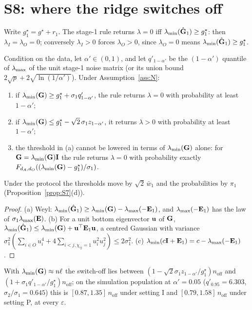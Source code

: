 \section{S8: where the ridge switches off}
\label{sec:S8}

Write $g_1^\star=g^\star+r_1$. The stage-1 rule returns $\lambda=0$ iff $\lambda_{\min}(\hat{\mathbf{G}}_1)\ge g^\star_1$: then $\lambda_I=\lambda_O=0$; conversely $\lambda_I>0$ forces $\lambda_O>0$, since $\lambda_O=0$ means $\lambda_{\min}(\hat{\mathbf{G}}_1)\ge g^\star_1$.

\begin{proposition}\label{prop:S8}
Condition on the data, let $\alpha'\in(0,1)$, and let $q'_{1-\alpha'}$ be the $(1-\alpha')$ quantile of $\lambda_{\max}$ of the unit stage-1 noise matrix (or its union bound $2\sqrt p+2\sqrt{\ln(1/\alpha')}$). Under Assumption~\ref{ass:N}:
\begin{enumerate}[nosep,label=(\alph*)]
  \item if $\lambda_{\min}(\mathbf{G})\ge g^\star_1+\sigma_1q'_{1-\alpha'}$, the rule returns $\lambda=0$ with probability at least $1-\alpha'$;
  \item if $\lambda_{\min}(\mathbf{G})\le g^\star_1-\sqrt2\,\sigma_1z_{1-\alpha'}$, it returns $\lambda>0$ with probability at least $1-\alpha'$;
  \item the threshold in (a) cannot be lowered in terms of $\lambda_{\min}(\mathbf{G})$ alone: for $\mathbf{G}=\lambda_{\min}(\mathbf{G})\mathbf{I}$ the rule returns $\lambda=0$ with probability exactly $F_{d_A,d_O}((\lambda_{\min}(\mathbf{G})-g^\star_1)/\sigma_1)$.
\end{enumerate}
Under the protocol the thresholds move by $\sqrt2\,\bar w_1$ and the probabilities by $\pi_1$ (Proposition~\ref{prop:S7}(d)).
\end{proposition}
\begin{proof}
(a) Weyl: $\lambda_{\min}(\hat{\mathbf{G}}_1)\ge\lambda_{\min}(\mathbf{G})-\lambda_{\max}(-\mathbf{E}_1)$, and $\lambda_{\max}(-\mathbf{E}_1)$ has the law of $\sigma_1\lambda_{\max}(\mathbf{E})$. (b) For a unit bottom eigenvector $\mathbf{u}$ of $\mathbf{G}$, $\lambda_{\min}(\hat{\mathbf{G}}_1)\le\lambda_{\min}(\mathbf{G})+\mathbf{u}^\top\mathbf{E}_1\mathbf{u}$, a centred Gaussian with variance $\sigma_1^2(\sum_{i\in O}u_i^4+4\sum_{i<j,\chi_{ij}=1}u_i^2u_j^2)\le2\sigma_1^2$. (c) $\lambda_{\min}(c\mathbf{I}+\mathbf{E}_1)=c-\lambda_{\max}(-\mathbf{E}_1)$.
\end{proof}
With $\lambda_{\min}(\mathbf{G})\approx n\ell$ the switch-off lies between $(1-\sqrt2\sigma_1z_{1-\alpha'}/g^\star_1)n_{\mathrm{off}}$ and $(1+\sigma_1q'_{1-\alpha'}/g^\star_1)n_{\mathrm{off}}$; on the simulation population at $\alpha'=0.05$ ($q'_{0.95}=6.303$, $\sigma_2/\sigma_1=0.645$) this is $[0.87,1.35]\,n_{\mathrm{off}}$ under setting I and $[0.79,1.58]\,n_{\mathrm{off}}$ under setting P, at every $\varepsilon$.

